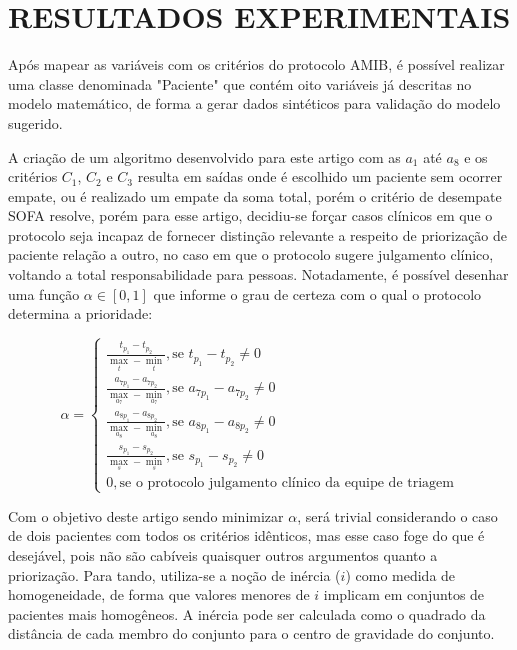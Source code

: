 \documentclass[12pt]{article}
\begin{document}
\section{RESULTADOS EXPERIMENTAIS}

Após mapear as variáveis com os critérios do protocolo AMIB, é possível realizar uma classe denominada "Paciente" que contém oito variáveis já descritas no modelo matemático, de forma a gerar dados sintéticos para validação do modelo sugerido.

A criação de um algoritmo desenvolvido para este artigo com as $a_1$ até $a_8$ e os critérios $C_1$, $C_2$ e $C_3$ resulta em saídas onde é escolhido um paciente sem ocorrer empate, ou é realizado um empate da soma total, porém o critério de desempate SOFA resolve, porém para esse artigo, decidiu-se forçar casos clínicos em que o protocolo seja incapaz de fornecer distinção relevante a respeito de priorização de paciente relação a outro, no caso em que o protocolo sugere julgamento clínico, voltando a total responsabilidade para pessoas.
Notadamente, é possível desenhar uma função $\alpha \in [0, 1]$ que informe o grau de certeza com o qual o protocolo determina a prioridade:

\[
\alpha = \begin{cases}
    \frac{t_{p_1} - t_{p_2}}{\max_t - \min_t}, \text{se } t_{p_1} - t_{p_2} \neq 0 \\
    \frac{a_{7p_1} - a_{7p_2}}{\max_{a_7} - \min_{a_7}}, \text{se } a_{7p_1} - a_{7p_2} \neq 0 \\
    \frac{a_{8p_1} - a_{8p_2}}{\max_{a_8} - \min_{a_8}}, \text{se } a_{8p_1} - a_{8p_2} \neq 0 \\
    \frac{s_{p_1} - s_{p_2}}{\max_s - \min_s}, \text{se } s_{p_1} - s_{p_2} \neq 0 \\
    0, \text{se o protocolo julgamento clínico da equipe de triagem}
\end{cases}
\] 

Com o objetivo deste artigo sendo minimizar $\alpha$, será trivial considerando o caso de dois pacientes com todos os critérios idênticos, mas esse caso foge do que é desejável, pois não são cabíveis quaisquer outros argumentos quanto a priorização.
Para tando, utiliza-se a noção de inércia ($i$) como medida de homogeneidade, de forma que valores menores de $i$ implicam em conjuntos de pacientes mais homogêneos.
A inércia pode ser calculada como o quadrado da distância de cada membro do conjunto para o centro de gravidade do conjunto.
\end{document}
